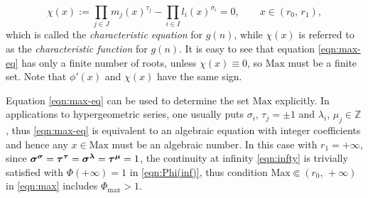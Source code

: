 \documentclass[a4paper,12pt]{article}
\theoremstyle{plain}
\def\Z{\mathbb{Z}}
\def\sblambda{\mbox{\boldmath ${\scriptstyle \lambda}$}}
\def\sbmu{\mbox{\boldmath ${\scriptstyle \mu}$}}
\def\bsigma{\mbox{\boldmath $\sigma$}}
\def\sbsigma{\mbox{\boldmath ${\scriptstyle \sigma}$}}
\def\btau{\mbox{\boldmath $\tau$}}
\def\sbtau{\mbox{\boldmath ${\scriptstyle \tau}$}}
\def\Phim{\Phi_{\scriptstyle \mathrm{max}}}
\def\Mm{\mathrm{M{\scriptstyle ax}}}
\begin{document}
\begin{equation} \label{eqn:max-eq}
\chi( x ) :=  \prod_{j \in J} m_j( x )^{\tau_j} - \prod_{i \in I} l_i( x )^{\sigma_i} = 0,   
\qquad x \in (r_0, \, r_1),   
\end{equation}
which is called the {\sl characteristic equation} for $g(n)$, while $\chi( x )$ 
is referred to as the {\sl characteristic function} for $g(n)$.  
It is easy to see that equation \eqref{eqn:max-eq} has only a finite number of roots, 
unless $\chi(x) \equiv 0$, so $\Mm$ must be a finite set.      
Note that $\phi'(x)$ and $\chi(x)$ have the same sign.   
\par
Equation \eqref{eqn:max-eq} can be used to determine the set $\Mm$ explicitly. 
In applications to hypergeometric series, one usually puts $\sigma_i$, $\tau_j = 
\pm 1$ 
and $\lambda_i$, $\mu_j \in \Z$, thus \eqref{eqn:max-eq} is equivalent to an 
algebraic equation with integer coefficients and hence any $x \in \Mm$ 
must be an algebraic number. 
In this case with $r_1 = +\infty$, since $\bsigma^{\sbsigma} = \btau^{\sbtau} = 
\bsigma^{\sblambda} = \btau^{\sbmu} = 1$, the continuity at infinity \eqref{eqn:infty} 
is trivially satisfied with $\Phi(+ \infty) = 1$ in \eqref{eqn:Phi(inf)}, thus condition 
$\Mm \Subset (r_0, \, +\infty)$ in \eqref{eqn:max} includes $\Phim > 1$.  
\end{document}
